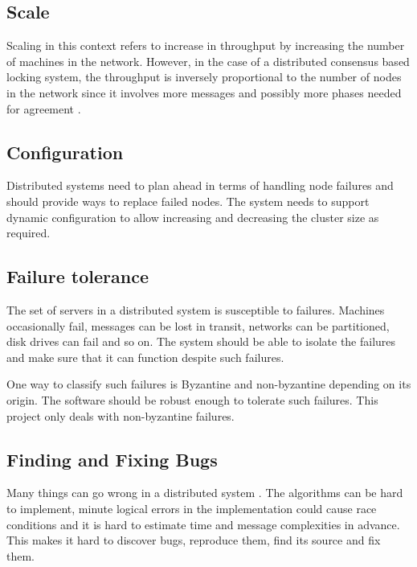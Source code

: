 \subsection{Scale}

Scaling in this context refers to increase in throughput by increasing the
number of machines in the network. However, in the case of a distributed 
consensus based locking system, the throughput is inversely proportional to the
number of nodes in the network since it involves more messages and possibly
more phases needed for agreement%
.

\subsection{Configuration}

Distributed systems need to plan ahead in terms of handling node failures and
should provide ways to replace failed nodes. The system needs to support dynamic
configuration to allow increasing and decreasing the cluster size as required.

\subsection{Failure tolerance}

The set of servers in a distributed system is susceptible to failures.
Machines occasionally fail, messages can be lost in transit, networks can be
partitioned, disk drives can fail and so on. The system should be able to
isolate the failures and make sure that it can function despite such failures.

One way to classify such failures is Byzantine%
and non-byzantine%
depending on its origin. The software should be robust enough to tolerate such
failures. This project only deals with non-byzantine failures.

\subsection{Finding and Fixing Bugs}

Many things can go wrong in a distributed system 
\citep{Rotem-gal-oz_fallaciesof}. The algorithms can be hard to implement, 
minute logical errors in the implementation could cause race conditions and
it is hard to estimate time and message complexities in advance. This makes it
hard to discover bugs, reproduce them, find its source and fix them.

